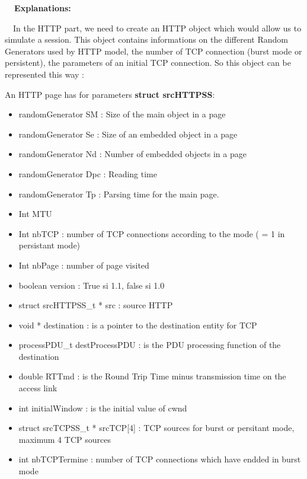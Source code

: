 \documentclass[a4paper]{article}
\title{}
\author{}
\date{2015-03-11T04:25:58.947358726}
\begin{document}
{\bfseries
\ \ Explanations:}


\bigskip

\ \ In the HTTP part, we need to create an HTTP object which would allow
us to simulate a session. This object contains informations on the
different Random Generators used by HTTP model, the number of TCP
connection (burst mode or persistent), the parameters of an initial TCP
connection. So this object can be represented this way :


\bigskip

{
An HTTP page has for parameters \textbf{struct srcHTTPSS}:}


\begin{itemize}
\item randomGenerator SM : Size of the main object in a page
\end{itemize}
\begin{itemize}
\item randomGenerator Se : Size of an embedded object in a page
\end{itemize}
\begin{itemize}
\item randomGenerator Nd : Number of embedded objects in a page
\end{itemize}
\begin{itemize}
\item randomGenerator Dpc : Reading time
\end{itemize}
\begin{itemize}
\item randomGenerator Tp : Parsing time for the main page.
\item Int MTU
\item Int nbTCP : number of TCP connections according to the mode ( = 1
in persistant mode)
\item Int nbPage : number of page visited
\item {
boolean version : True si 1.1, false si 1.0}
\item struct srcHTTPSS\_t * src : source HTTP
\item void * destination : is a pointer to the destination entity for
TCP
\item processPDU\_t destProcessPDU : is the PDU processing function of
the destination
\item double RTTmd : is the Round Trip Time minus transmission time on
the access link
\item int initialWindow : is the initial value of cwnd
\item struct srcTCPSS\_t * srcTCP[4] : TCP sources for burst or
persitant mode, maximum 4 TCP sources
\item {
int nbTCPTermine : number of TCP connections which have endded in burst
mode}
\end{itemize}
\end{document}
